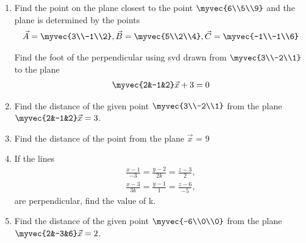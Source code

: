 \begin{enumerate}[label=\thesubsection.\arabic*.,ref=\thesubsection.\theenumi]
\solution

\item Find the point on the plane closest to the point $\myvec{6\\5\\9}$ and the plane is determined by the points 
\begin{align*}
    \vec{A}=\myvec{3\\-1\\2}, \vec{B}=\myvec{5\\2\\4}, \vec{C}=\myvec{-1\\-1\\6}
\end{align*}
\solution

%
 Find the foot of the perpendicular using svd drawn from $\myvec{3\\-2\\1}$ to the plane
 \begin{align}
 \myvec{2&-1&2}\vec{x}+3=0
 \end{align}
%
\solution
%
%
\item 
Find the distance of the given point $\myvec{3\\-2\\1}$ from the plane $\myvec{2&-1&2}\vec{x} = 3$.

\solution

%
\item Find the distance of the point  from the plane $\vec{x}$ = 9

\solution


\item If the lines
\begin{align}
	\frac{x - 1}{-3} = \frac{y - 2}{2k} = \frac{z - 3}{2},\\
	\frac{x - 3}{3k} = \frac{y - 1}{1} = \frac{z - 6}{-5},
\end{align}
are perpendicular, find the value of k.

\solution

%
\item Find the distance of the given point $\myvec{-6\\0\\0}$ from the plane $\myvec{2&-3&6}\vec{x} = 2$.
%
\\
\solution


\end{enumerate}
